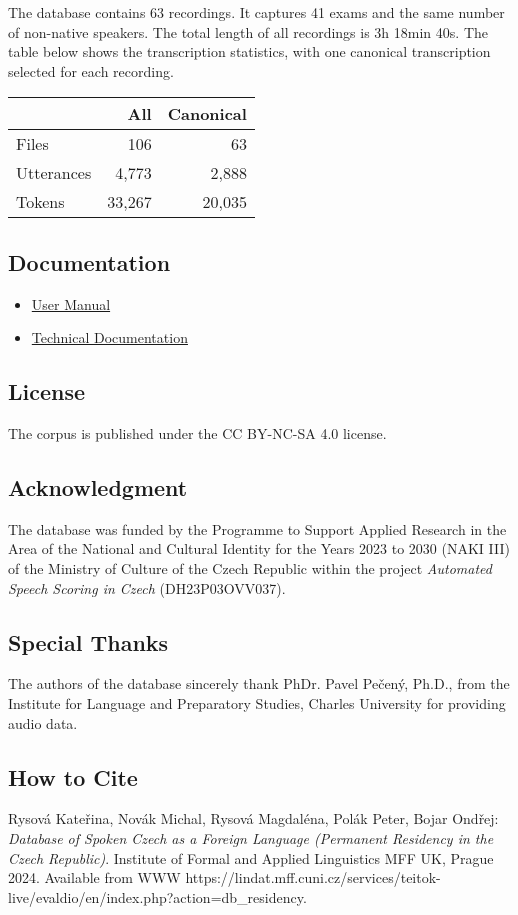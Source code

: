 \documentclass[
]{article}
\providecommand{\tightlist}{%
  \setlength{\itemsep}{0pt}\setlength{\parskip}{0pt}}
\begin{document}
The database contains 63 recordings. It captures 41 exams and the same
number of non-native speakers. The total length of all recordings is 3h
18min 40s. The table below shows the transcription statistics, with one
canonical transcription selected for each recording.

\begin{longtable}[]{@{}lrr@{}}
\toprule
& All & Canonical\tabularnewline
\midrule
\endhead
Files & 106 & 63\tabularnewline
Utterances & 4,773 & 2,888\tabularnewline
Tokens & 33,267 & 20,035\tabularnewline
\bottomrule
\end{longtable}

\hypertarget{documentation}{%
\subsection{Documentation}\label{documentation}}

\begin{itemize}
\tightlist
\item
  \href{USER_MANUAL.md}{User Manual}
\item
  \href{TECH_DOC.md}{Technical Documentation}
\end{itemize}

\hypertarget{license}{%
\subsection{License}\label{license}}

The corpus is published under the CC BY-NC-SA 4.0 license.

\hypertarget{acknowledgment}{%
\subsection{Acknowledgment}\label{acknowledgment}}

The database was funded by the Programme to Support Applied Research in
the Area of the National and Cultural Identity for the Years 2023 to
2030 (NAKI III) of the Ministry of Culture of the Czech Republic within
the project \emph{Automated Speech Scoring in Czech} (DH23P03OVV037).

\hypertarget{special-thanks}{%
\subsection{Special Thanks}\label{special-thanks}}

The authors of the database sincerely thank PhDr. Pavel Pečený, Ph.D.,
from the Institute for Language and Preparatory Studies, Charles
University for providing audio data.

\hypertarget{how-to-cite}{%
\subsection{How to Cite}\label{how-to-cite}}

Rysová Kateřina, Novák Michal, Rysová Magdaléna, Polák Peter, Bojar
Ondřej: \emph{Database of Spoken Czech as a Foreign Language (Permanent
Residency in the Czech Republic)}. Institute of Formal and Applied
Linguistics MFF UK, Prague 2024. Available from WWW
https://lindat.mff.cuni.cz/services/teitok-live/evaldio/en/index.php?action=db\_residency.
\end{document}
